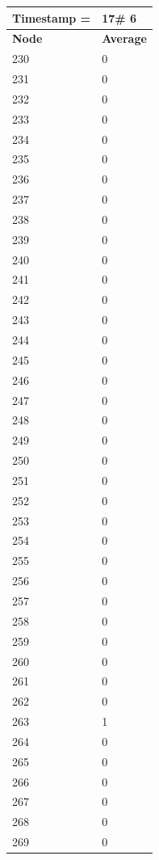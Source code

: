 \begin{tabular}{|l||l|}
\hline
\textbf{Timestamp =} & \textbf{17}\# 6\\\hline
	\textbf{Node} & \textbf{Average} \\ \hline
\hline
	230 & 0 \\ \hline
	231 & 0 \\ \hline
	232 & 0 \\ \hline
	233 & 0 \\ \hline
	234 & 0 \\ \hline
	235 & 0 \\ \hline
	236 & 0 \\ \hline
	237 & 0 \\ \hline
	238 & 0 \\ \hline
	239 & 0 \\ \hline
	240 & 0 \\ \hline
	241 & 0 \\ \hline
	242 & 0 \\ \hline
	243 & 0 \\ \hline
	244 & 0 \\ \hline
	245 & 0 \\ \hline
	246 & 0 \\ \hline
	247 & 0 \\ \hline
	248 & 0 \\ \hline
	249 & 0 \\ \hline
	250 & 0 \\ \hline
	251 & 0 \\ \hline
	252 & 0 \\ \hline
	253 & 0 \\ \hline
	254 & 0 \\ \hline
	255 & 0 \\ \hline
	256 & 0 \\ \hline
	257 & 0 \\ \hline
	258 & 0 \\ \hline
	259 & 0 \\ \hline
	260 & 0 \\ \hline
	261 & 0 \\ \hline
	262 & 0 \\ \hline
	263 & 1 \\ \hline
	264 & 0 \\ \hline
	265 & 0 \\ \hline
	266 & 0 \\ \hline
	267 & 0 \\ \hline
	268 & 0 \\ \hline
	269 & 0 \\ \hline
\end{tabular}

